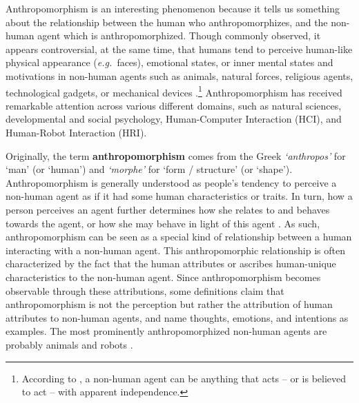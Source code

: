 \documentclass{frontiersSCNS} %
\newcommand{\eg}{{\textit{e.g.~}}}
\begin{document}

Anthropomorphism is an interesting phenomenon because it tells us something about the relationship between the human who anthropomorphizes, and the non-human agent which is anthropomorphized. Though commonly observed, it appears controversial, at the same time, that humans tend to perceive human-like physical appearance (\eg faces), emotional states, or inner mental states and motivations in non-human agents such as animals, natural forces, religious agents, technological gadgets, or mechanical devices \citep{epley_when_2008}.\footnote{According to \cite{epley_when_2008}, a non-human agent can be anything that acts -- or is believed to act -- with apparent independence.}  Anthropomorphism has received remarkable attention across various different domains, such as natural sciences, developmental and social psychology, Human-Computer Interaction (HCI), and Human-Robot Interaction (HRI).

Originally, the term \textbf{anthropomorphism} comes from the Greek \textit{`anthropos'} for `man' (or `human') and \textit{`morphe'} for `form / structure' (or `shape'). Anthropomorphism is generally understood as people's tendency to perceive a non-human agent as if it had some human characteristics or traits. In turn, how a person perceives an agent further determines how she relates to and behaves towards the agent, or how she may behave in light of this agent \citep{epley_when_2008}.
As such, anthropomorphism can be seen as a special kind of relationship between a human interacting with a non-human agent. This anthropomorphic relationship is often characterized by the fact that the human attributes or ascribes human-unique characteristics to the non-human agent. Since anthropomorphism becomes observable through these attributions, some definitions claim that anthropomorphism is not the perception but rather the attribution of human attributes to non-human agents, and name thoughts, emotions, and intentions as examples. The most prominently anthropomorphized non-human agents are probably animals and robots \citep{duffy_anthropomorphism_2003,schmitz_concepts_2011}.
\end{document}
